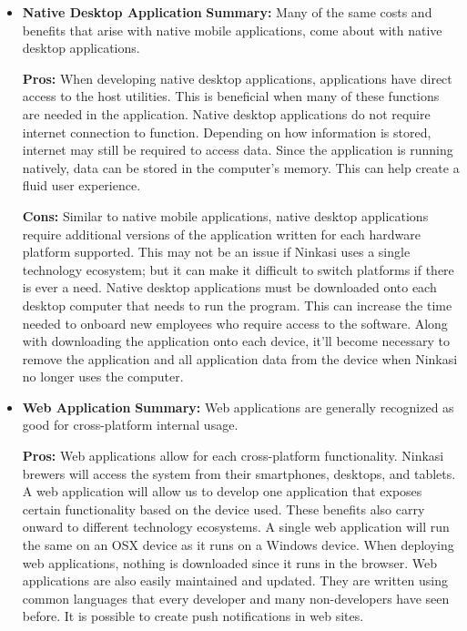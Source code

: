 \documentclass[draftclsnofoot,onecolumn,letterpaper,10pt]{IEEEtran}
\begin{document}
\begin{itemize}
				\item{\textbf{Native Desktop Application}}
					\textbf{Summary:}
						Many of the same costs and benefits that arise with native mobile applications, come about with native desktop applications.

					\textbf{Pros:}
						When developing native desktop applications, applications have direct access to the host utilities.
						This is beneficial when many of these functions are needed in the application.
						Native desktop applications do not require internet connection to function.
						Depending on how information is stored, internet may still be required to access data.
						Since the application is running natively, data can be stored in the computer's memory.
						This can help create a fluid user experience.

					\textbf{Cons:}
						Similar to native mobile applications, native desktop applications require additional versions of the application written for each hardware platform supported.
						This may not be an issue if Ninkasi uses a single technology ecosystem; but it can make it difficult to switch platforms if there is ever a need.
						Native desktop applications must be downloaded onto each desktop computer that needs to run the program.
						This can increase the time needed to onboard new employees who require access to the software.
						Along with downloading the application onto each device, it'll become necessary to remove the application and all application data from the device when Ninkasi no longer uses the computer.


				\item{\textbf{Web Application}}
					\textbf{Summary:}
						Web applications are generally recognized as good for cross-platform internal usage\cite{SearchCloudOverview}.

					\textbf{Pros:}
						Web applications allow for each cross-platform functionality.
						Ninkasi brewers will access the system from their smartphones, desktops, and tablets.
						A web application will allow us to develop one application that exposes certain functionality based on the device used.
						These benefits also carry onward to different technology ecosystems.
						A single web application will run the same on an OSX device as it runs on a Windows device.
						When deploying web applications, nothing is downloaded since it runs in the browser.
						Web applications are also easily maintained and updated.
						They are written using common languages that every developer and many non-developers have seen before.
						It is possible to create push notifications in web sites\cite{GooglePushNotifications}.


\end{itemize}
\end{document}
